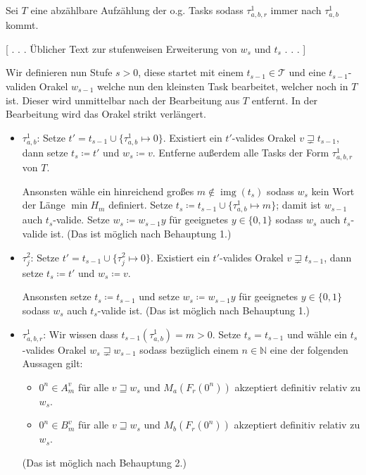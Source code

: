 \documentclass[nofonts]{uebung}
\DeclareMathOperator{\img}{img}
\begin{document}
Sei $T$ eine abzählbare Aufzählung der o.g. Tasks sodass $\tau^1_{a,b,r}$ immer nach $\tau^1_{a,b}$ kommt.

[ . . . Üblicher Text zur stufenweisen Erweiterung von $w_s$ und $t_s$ . . . ]

Wir definieren nun Stufe $s>0$, diese startet mit einem $t_{s-1}\in\mathcal T$ und eine $t_{s-1}$-validen Orakel $w_{s-1}$ welche nun den kleinsten Task bearbeitet, welcher noch in $T$ ist. Dieser wird unmittelbar nach der Bearbeitung aus $T$ entfernt. In der Bearbeitung wird das Orakel strikt verlängert.
\begin{itemize}

    \item $\tau^1_{a,b}$: Setze $t'=t_{s-1}\cup\{\tau^1_{a,b}\mapsto 0\}$. Existiert ein $t'$-valides Orakel $v\sqsupsetneq t_{s-1}$, dann setze $t_s\coloneqq t'$ und $w_s\coloneqq v$. Entferne außerdem alle Tasks der Form $\tau^1_{a,b,r}$ von $T$.

        Ansonsten wähle ein hinreichend großes $m\not\in \img(t_s)$ sodass $w_s$ kein Wort der Länge $\min H_m$ definiert. Setze $t_s\coloneqq t_{s-1}\cup \{ \tau^1_{a,b}\mapsto m \}$; damit ist $w_{s-1}$ auch $t_s$-valide. Setze $w_s\coloneqq w_{s-1}y$ für geeignetes $y\in\{0,1\}$ sodass $w_s$ auch $t_s$-valide ist. (Das ist möglich nach Behauptung 1.)

    \item $\tau^2_j$: Setze $t'=t_{s-1}\cup\{\tau^2_j\mapsto 0\}$. Existiert ein $t'$-valides Orakel $v\sqsupsetneq t_{s-1}$, dann setze $t_s\coloneqq t'$ und $w_s\coloneqq v$.

        Ansonsten setze $t_s\coloneqq t_{s-1}$ und setze $w_s\coloneqq w_{s-1}y$ für geeignetes $y\in\{0,1\}$ sodass $w_s$ auch $t_s$-valide ist. (Das ist möglich nach Behauptung 1.)

    \item $\tau^1_{a,b,r}$: Wir wissen dass $t_{s-1}(\tau^1_{a,b})=m>0$. Setze $t_s=t_{s-1}$ und wähle ein $t_s$-valides Orakel $w_s\sqsupsetneq w_{s-1}$ sodass bezüglich einem $n\in\mathbb N$ eine der folgenden Aussagen gilt:
        \begin{itemize}[nosep,endpenalty=10000]
            \item $0^n\in A_m^v$ für alle $v\sqsupseteq w_s$ und $M_a(F_r(0^n))$ akzeptiert definitiv relativ zu $w_s$.
            \item $0^n\in B_m^v$ für alle $v\sqsupseteq w_s$ und $M_b(F_r(0^n))$ akzeptiert definitiv relativ zu $w_s$.
        \end{itemize} (Das ist möglich nach Behauptung 2.)
\end{itemize}
\end{document}
